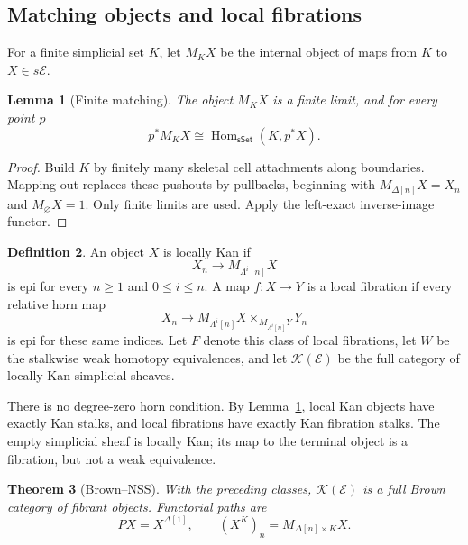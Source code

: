 \documentclass[12pt]{amsart}
\newtheorem{thm}{Theorem}[section]
\newtheorem{lem}[thm]{Lemma}
\theoremstyle{definition}
\newtheorem{defn}[thm]{Definition}
\theoremstyle{remark}
\numberwithin{equation}{section}
\newcommand{\E}{\mathcal E}
\newcommand{\KSh}{\mathcal K(\E)}
\newcommand{\sSet}{\mathsf{sSet}}
\DeclareMathOperator{\Hom}{Hom}
\begin{document}
\subsection{Matching objects and local fibrations}

For a finite simplicial set $K$, let $M_KX$ be the internal
object of maps from $K$ to $X\in s\E$.

\begin{lem}[Finite matching]\label{lem:finite-matching}
The object $M_KX$ is a finite limit, and for every point $p$
\[
 p^*M_KX\cong\Hom_{\sSet}(K,p^*X).
\]
\end{lem}

\begin{proof}
Build $K$ by finitely many skeletal cell attachments along
boundaries. Mapping out replaces these pushouts by
pullbacks, beginning with $M_{\Delta[n]}X=X_n$ and
$M_\varnothing X=1$. Only finite limits are used.
Apply the left-exact inverse-image functor.
\end{proof}

\begin{defn}
An object $X$ is locally Kan if
\[
 X_n\longrightarrow M_{\Lambda^i[n]}X
\]
is epi for every $n\ge1$ and $0\le i\le n$. A map $f:X\to Y$
is a local fibration if every relative horn map
\begin{equation}\label{eq:relative-horn}
 X_n\longrightarrow
 M_{\Lambda^i[n]}X
 \times_{M_{\Lambda^i[n]}Y}Y_n
\end{equation}
is epi for these same indices. Let $F$ denote this class of local
fibrations, let $W$ be the stalkwise weak homotopy equivalences,
and let $\KSh$ be the full category of locally Kan simplicial sheaves.
\end{defn}

There is no degree-zero horn condition. By
Lemma~\ref{lem:finite-matching}, local Kan objects have
exactly Kan stalks, and local fibrations have exactly Kan
fibration stalks. The empty simplicial sheaf is locally Kan;
its map to the terminal object is a fibration, but not a
weak equivalence.

\begin{thm}[Brown--NSS]\label{thm:sheaf-cfo}
With the preceding classes, $\KSh$ is a full Brown category
of fibrant objects. Functorial paths are
\[
 PX=X^{\Delta[1]},\qquad
 (X^K)_n=M_{\Delta[n]\times K}X.
\]
\end{thm}
\end{document}
